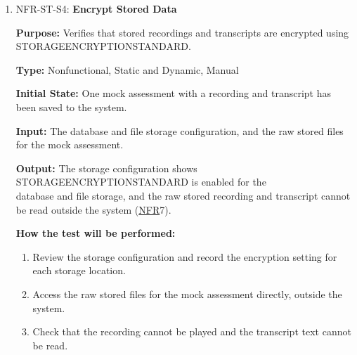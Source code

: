 \documentclass[12pt, titlepage]{article}
\newcommand{\srsnfr}[1]{\href{https://github.com/Nour-Fawaz/MacaBoca/blob/main/pdfs/SRS/SRS.pdf}{NFR}}
\renewcommand{\_}{\oldunderscore\allowbreak}
\begin{document}
\begin{enumerate}
  \item NFR-ST-S4: \textbf{Encrypt Stored Data\\}
  \begin{mdframed}[linewidth=0.5mm]
      \textbf{Purpose:} Verifies that stored recordings and transcripts are encrypted using STORAGE\_ENCRYPTION\_STANDARD. \par
      \textbf{Type:} Nonfunctional, Static and Dynamic, Manual \par
      \textbf{Initial State:} One mock assessment with a recording and transcript has been saved to the system. \par
      \textbf{Input:} The database and file storage configuration, and the raw stored files for the mock assessment. \par
      \textbf{Output:} The storage configuration shows 
      \\STORAGE\_ENCRYPTION\_STANDARD is enabled for the 
      \\database and file storage, and the raw stored recording and transcript cannot be read outside the system (\srsnfr*{7}). \par
      \textbf{How the test will be performed:}
      \begin{enumerate}
      \item[1.] Review the storage configuration and record the encryption setting for each storage location.
      \item[2.] Access the raw stored files for the mock assessment directly, outside the system.
      \item[3.] Check that the recording cannot be played and the transcript text cannot be read.
      \end{enumerate}
  \end{mdframed}


\end{enumerate}
\end{document}
